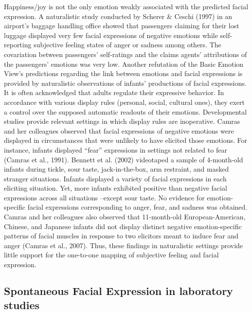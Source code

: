\documentclass[
  english,
  doc]{apa7}
\begin{document}
Happiness/joy is not the only emotion weakly associated with the predicted facial expression. A naturalistic study conducted by Scherer \& Ceschi (1997) in an airport's baggage handling office showed that passengers claiming for their lost luggage displayed very few facial expressions of negative emotions while self-reporting subjective feeling states of anger or sadness among others. The covariation between passengers' self-ratings and the claims agents' attributions of the passengers' emotions was very low. Another refutation of the Basic Emotion View's predictions regarding the link between emotions and facial expressions is provided by naturalistic observations of infants' productions of facial expressions. It is often acknowledged that adults regulate their expressive behavior. In accordance with various display rules (personal, social, cultural ones), they exert a control over the supposed automatic readouts of their emotions. Developmental studies provide relevant settings in which display rules are inoperative. Camras and her colleagues observed that facial expressions of negative emotions were displayed in circumstances that were unlikely to have elicited those emotions. For instance, infants displayed ``fear'' expressions in settings not related to fear (Camras et al., 1991). Bennett et al. (2002) videotaped a sample of 4-month-old infants during tickle, sour taste, jack-in-the-box, arm restraint, and masked stranger situations. Infants displayed a variety of facial expressions in each eliciting situation. Yet, more infants exhibited positive than negative facial expressions across all situations --except sour taste. No evidence for emotion-specific facial expressions corresponding to anger, fear, and sadness was obtained. Camras and her colleagues also observed that 11-month-old European-American, Chinese, and Japanese infants did not display distinct negative emotion-specific patterns of facial muscles in response to two elicitors meant to induce fear and anger (Camras et al., 2007). Thus, these findings in naturalistic settings provide little support for the one-to-one mapping of subjective feeling and facial expression.

\hypertarget{spontaneous-facial-expression-in-laboratory-studies}{%
\subsection{Spontaneous Facial Expression in laboratory studies}\label{spontaneous-facial-expression-in-laboratory-studies}}
\end{document}
